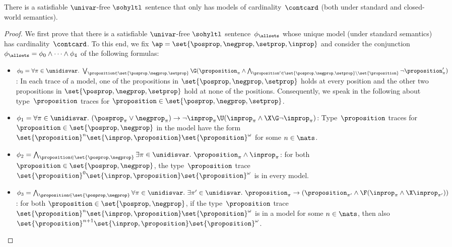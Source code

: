 \begin{thm}
\label{thm_modelsizelowerbound}
There is a satisfiable $\univar$-free $\sohyltl$ sentence that only has models of cardinality~$\contcard$ (both under standard and closed-world semantics).
\end{thm}

\begin{proof}
We first prove that there is a satisfiable $\univar$-free $\sohyltl$ sentence~$\phi_\allsets$  whose unique model (under standard semantics) has cardinality~$\contcard$.
To this end, we fix $\ap = \set{\posprop, \negprop,\setprop,\inprop}$ and consider the conjunction~$\phi_\allsets = \phi_0 \wedge \cdots \wedge \phi_4$ of the following formulas:
\begin{itemize}

\item $\phi_0 = \forall \pi \in \unidisvar.\ \bigvee_{\proposition \in \set{\posprop, \negprop,\setprop}} \G (\proposition_\pi \wedge \bigwedge_{\proposition' \in \set{\posprop, \negprop,\setprop} \setminus \set{\proposition}} \neg \proposition'_\pi )$: In each trace of a model, one of the propositions in $\set{\posprop, \negprop,\setprop}$ holds at every position and the other two propositions in $\set{\posprop, \negprop,\setprop}$ hold at none of the positions. Consequently, we speak in the following about type~$\proposition$ traces for $\proposition \in \set{\posprop, \negprop,\setprop}$.

\item $\phi_1 = \forall \pi \in \unidisvar.\ (\posprop_\pi \vee \negprop_\pi) \rightarrow \neg \inprop_\pi \U ( \inprop_\pi \wedge \X \G \neg \inprop_\pi )$: Type~$\proposition$ traces for $\proposition \in \set{\posprop,\negprop}$ in the model have the form~$\set{\proposition}^n \set{\inprop, \proposition} \set{\proposition}^\omega$ for some $n\in\nats$.

\item $\phi_2 = \bigwedge_{\proposition \in \set{\posprop,\negprop}} \exists\pi \in \unidisvar.\ \proposition_\pi \wedge \inprop_\pi$: for both $\proposition \in \set{\posprop,\negprop}$, the type~$\proposition$ trace $\set{\proposition}^0 \set{\inprop,\proposition} \set{\proposition}^\omega$ is in every model.

\item $\phi_3 = \bigwedge_{\proposition \in \set{\posprop,\negprop}}\forall \pi \in \unidisvar.\ \exists\pi'\in\unidisvar.\ \proposition_\pi \rightarrow ( \proposition_{\pi'} \wedge  \F (\inprop_\pi \wedge \X \inprop_{\pi'}))$: for both $\proposition \in \set{\posprop,\negprop}$, if the type~$\proposition$ trace~$\set{\proposition}^n \set{\inprop,\proposition} \set{\proposition}^\omega$ is in a model for some $n\in\nats$, then also $\set{\proposition}^{n+1} \set{\inprop,\proposition} \set{\proposition}^\omega$.
\end{itemize}


\end{proof}
